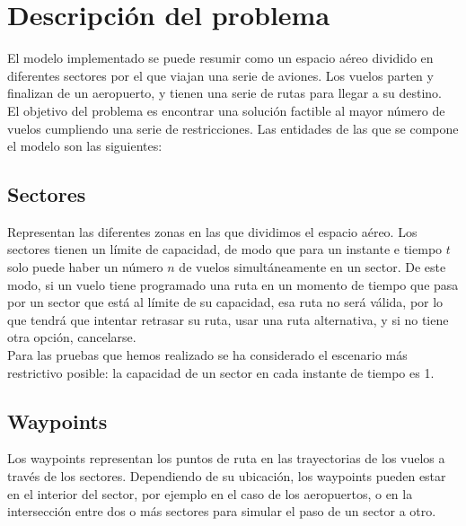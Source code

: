 \chapter{Descripción del problema}
\label{descripción}
El modelo implementado se puede resumir como un espacio aéreo dividido en diferentes sectores por el que viajan una serie de aviones. Los vuelos parten y finalizan de un aeropuerto, y tienen una serie de rutas para llegar a su destino.\\
El objetivo del problema es encontrar una solución factible al mayor número de vuelos cumpliendo una serie de restricciones. Las entidades de las que se compone el modelo son las siguientes:

\section{Sectores}
Representan las diferentes zonas en las que dividimos el espacio aéreo. Los sectores tienen un límite de capacidad, de modo que para un instante e tiempo $t$ solo puede haber un número $n$ de vuelos simultáneamente en un sector. De este modo, si un vuelo tiene programado una ruta en un momento de tiempo que pasa por un sector que está al límite de su capacidad, esa ruta no será válida, por lo que tendrá que intentar retrasar su ruta, usar una ruta alternativa, y si no tiene otra opción, cancelarse.\\
Para las pruebas que hemos realizado se ha considerado el escenario más restrictivo posible: la capacidad de un sector en cada instante de tiempo es 1.

\section{Waypoints}
Los waypoints representan los puntos de ruta en las trayectorias de los vuelos a través de los sectores. Dependiendo de su ubicación, los waypoints pueden estar en el interior del sector, por ejemplo en el caso de los aeropuertos, o en la intersección entre dos o más sectores para simular el paso de un sector a otro.


